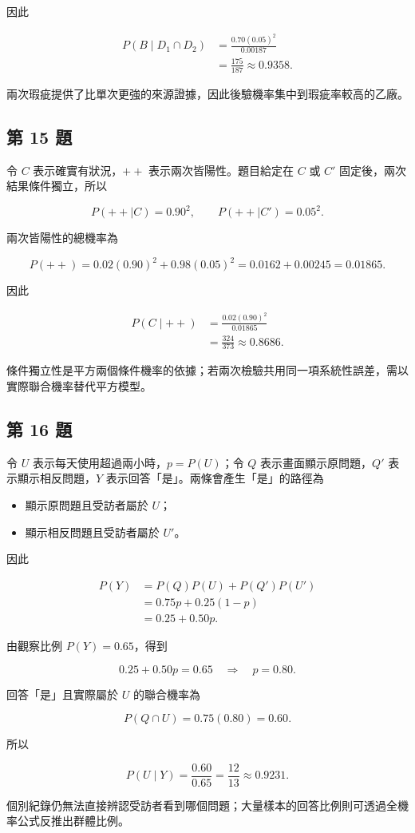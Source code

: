\documentclass[11pt,a4paper]{article}
\providecommand{\tightlist}{%
  \setlength{\itemsep}{0pt}\setlength{\parskip}{0pt}}
\begin{document}
因此

\[
\begin{aligned}
P(B\mid D_1\cap D_2)
&=\frac{0.70(0.05)^2}{0.00187}\\
&=\boxed{\frac{175}{187}\approx0.9358}.
\end{aligned}
\]

兩次瑕疵提供了比單次更強的來源證據，因此後驗機率集中到瑕疵率較高的乙廠。

\subsection{第 15 題}\label{ux7b2c-15-ux984c}

令 \(C\) 表示確實有狀況，\(++\) 表示兩次皆陽性。題目給定在 \(C\) 或 \(C'\) 固定後，兩次結果條件獨立，所以

\[
P(++\mid C)=0.90^2,
\qquad
P(++\mid C')=0.05^2.
\]

兩次皆陽性的總機率為

\[
P(++)=0.02(0.90)^2+0.98(0.05)^2
=0.0162+0.00245
=0.01865.
\]

因此

\[
\begin{aligned}
P(C\mid ++)
&=\frac{0.02(0.90)^2}{0.01865}\\
&=\boxed{\frac{324}{373}\approx0.8686}.
\end{aligned}
\]

條件獨立性是平方兩個條件機率的依據；若兩次檢驗共用同一項系統性誤差，需以實際聯合機率替代平方模型。

\subsection{第 16 題}\label{ux7b2c-16-ux984c}

令 \(U\) 表示每天使用超過兩小時，\(p=P(U)\)；令 \(Q\) 表示畫面顯示原問題，\(Q'\) 表示顯示相反問題，\(Y\) 表示回答「是」。兩條會產生「是」的路徑為

\begin{itemize}
\tightlist
\item
  顯示原問題且受訪者屬於 \(U\)；
\item
  顯示相反問題且受訪者屬於 \(U'\)。
\end{itemize}

因此

\[
\begin{aligned}
P(Y)
&=P(Q)P(U)+P(Q')P(U')\\
&=0.75p+0.25(1-p)\\
&=0.25+0.50p.
\end{aligned}
\]

由觀察比例 \(P(Y)=0.65\)，得到

\[
0.25+0.50p=0.65
\quad\Longrightarrow\quad
p=\boxed{0.80}.
\]

回答「是」且實際屬於 \(U\) 的聯合機率為

\[
P(Q\cap U)=0.75(0.80)=0.60.
\]

所以

\[
P(U\mid Y)
=\frac{0.60}{0.65}
=\boxed{\frac{12}{13}\approx0.9231}.
\]

個別紀錄仍無法直接辨認受訪者看到哪個問題；大量樣本的回答比例則可透過全機率公式反推出群體比例。
\end{document}
